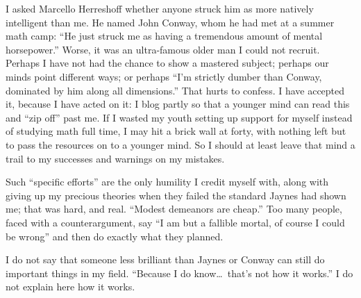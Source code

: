 I asked Marcello Herreshoff whether anyone struck him as more natively intelligent than me. He named John Conway, whom he had met at a summer math camp: ``He just struck me as having a tremendous amount of mental horsepower.'' Worse, it was an ultra-famous older man I could not recruit. Perhaps I have not had the chance to show a mastered subject; perhaps our minds point different ways; or perhaps ``I'm strictly dumber than Conway, dominated by him along all dimensions.'' That hurts to confess. I have accepted it, because I have acted on it: I blog partly so that a younger mind can read this and ``zip off'' past me. If I wasted my youth setting up support for myself instead of studying math full time, I may hit a brick wall at forty, with nothing left but to pass the resources on to a younger mind. So I should at least leave that mind a trail to my successes and warnings on my mistakes.

Such ``specific efforts'' are the only humility I credit myself with, along with giving up my precious theories when they failed the standard Jaynes had shown me; that was hard, and real. ``Modest demeanors are cheap.'' Too many people, faced with a counterargument, say ``I am but a fallible mortal, of course I could be wrong'' and then do exactly what they planned. 

I do not say that someone less brilliant than Jaynes or Conway can still do important things in my field. ``Because I do know\ldots\ that's not how it works.'' I do not explain here how it works. 

